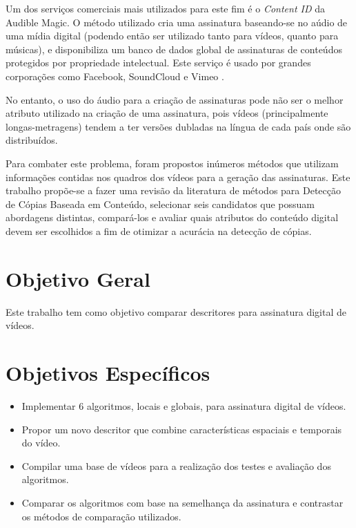 Um dos serviços comerciais mais utilizados para este fim é o \textit{Content ID} da Audible Magic. O método utilizado cria uma assinatura baseando-se no aúdio de uma mídia digital (podendo então ser utilizado tanto para vídeos, quanto para músicas), e disponibiliza um banco de dados global de assinaturas de conteúdos protegidos por propriedade intelectual. Este serviço é usado por grandes corporações como Facebook, SoundCloud e Vimeo \citeauthor{audiblemagic}.

No entanto, o uso do áudio para a criação de assinaturas pode não ser o melhor atributo utilizado na criação de uma assinatura, pois vídeos (principalmente longas-metragens) tendem a ter versões dubladas na língua de cada país onde são distribuídos. 

Para combater este problema, foram propostos inúmeros métodos que utilizam informações contidas nos quadros dos vídeos para a geração das assinaturas. Este trabalho propõe-se a fazer uma revisão da literatura de métodos para Detecção de Cópias Baseada em Conteúdo, selecionar seis candidatos que possuam abordagens distintas, compará-los e avaliar quais atributos do conteúdo digital devem ser escolhidos a fim de otimizar a acurácia na detecção de cópias. 


\section{Objetivo Geral}
Este trabalho tem como objetivo comparar descritores para assinatura digital de vídeos.

\section{Objetivos Específicos}
\begin{itemize}
\item Implementar 6 algoritmos, locais e globais, para assinatura digital de vídeos.
\item Propor um novo descritor que combine características espaciais e temporais do vídeo.
\item Compilar uma base de vídeos para a realização dos testes e avaliação dos algoritmos.
\item Comparar os algoritmos com base na semelhança da assinatura e contrastar os métodos de comparação utilizados.
\end{itemize}